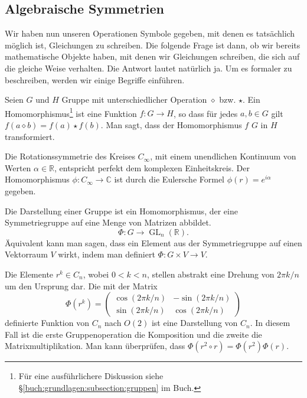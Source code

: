 \subsection{Algebraische Symmetrien}
Wir haben nun unseren Operationen Symbole gegeben, mit denen es tatsächlich
möglich ist, Gleichungen zu schreiben.  Die folgende Frage ist dann, ob wir
bereits mathematische Objekte haben, mit denen wir Gleichungen schreiben, die
sich auf die gleiche Weise verhalten. Die Antwort lautet natürlich ja.  Um es
formaler zu beschreiben, werden wir einige Begriffe einführen.
\begin{definition}[Gruppenhomomorphismus]
	Seien \(G\) und \(H\) Gruppe mit unterschiedlicher Operation \(\diamond\)
	bzw.  \(\star\). Ein Homomorphismus\footnote{ Für eine ausführlichere
	Diskussion siehe \S\ref{buch:grundlagen:subsection:gruppen} im Buch.} ist
	eine Funktion \(f: G \to H\), so dass für jedes \(a, b \in G\) gilt
	\(f(a\diamond b) = f(a) \star f(b)\).  Man sagt, dass der Homomorphismus
	\(f\) \(G\) in \(H\) transformiert.
\end{definition}
\begin{beispiel}
	Die Rotationssymmetrie des Kreises \(C_\infty\), mit einem unendlichen
	Kontinuum von Werten \(\alpha \in \mathbb{R}\), entspricht perfekt dem
	komplexen Einheitskreis. Der Homomorphismus \(\phi: C_\infty \to \mathbb{C}\)
	ist durch die Eulersche Formel \(\phi(r) = e^{i\alpha}\) gegeben.
\end{beispiel}

\begin{definition}
	Die Darstellung einer Gruppe ist ein Homomorphismus, der eine Symmetriegruppe
	auf eine Menge von Matrizen abbildet.
	\[
		\Phi: G \to \operatorname{GL}_n(\mathbb{R}).
	\]
	Äquivalent kann man sagen, dass ein Element aus der Symmetriegruppe auf einen
	Vektorraum \(V\) wirkt, indem man definiert \(\Phi : G \times V \to V\).
\end{definition}
\begin{beispiel}
	Die Elemente \(r^k \in C_n\), wobei \(0 < k < n\), stellen abstrakt eine
	Drehung von \(2\pi k/n\) um den Ursprung dar. Die mit der Matrix 
	\[
		\Phi(r^k) = \begin{pmatrix}
			\cos(2\pi k/n) & -\sin(2\pi k/n) \\
			\sin(2\pi k/n) &  \cos(2\pi k/n)
		\end{pmatrix}
	\]
	definierte Funktion von \(C_n\) nach \(O(2)\) ist eine Darstellung von
	\(C_n\). In diesem Fall ist die erste Gruppenoperation die Komposition und
	die zweite die Matrixmultiplikation. Man kann überprüfen, dass \(\Phi(r^2
	\circ r) = \Phi(r^2)\Phi(r)\).
\end{beispiel}

